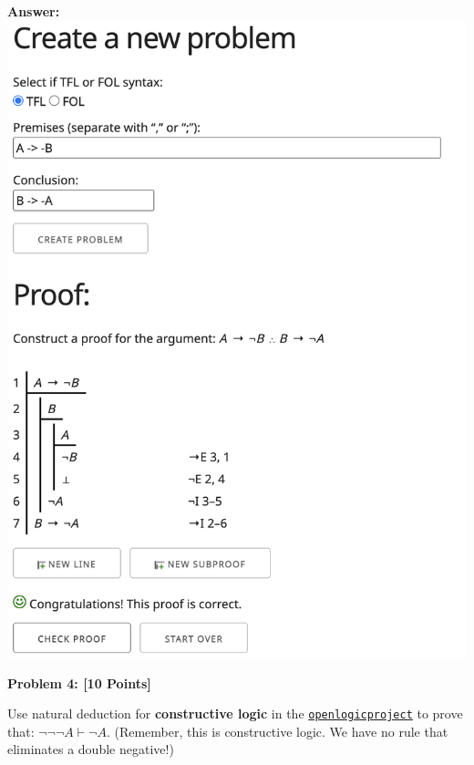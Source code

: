 \documentclass[12pt]{article}
\newcommand{\TURN}{\vdash}
\newcommand{\Problem}[3]{\mbox{} \newline \noindent \textbf{\textbf{Problem #1: #2 [#3 Points] \\ }}}
\begin{document}
\bf{Answer:}
\includegraphics[scale = 0.4]{hw2pr3.png}

\Problem{4}{}{10}

Use natural deduction for \textbf{constructive logic}  in the \href{http://proofs.openlogicproject.org}{\texttt{openlogicproject}} to prove  that:  $\neg \neg \neg A \TURN \neg A$.  (Remember, this is constructive logic.  We have no rule that eliminates a double negative!)
\end{document}
